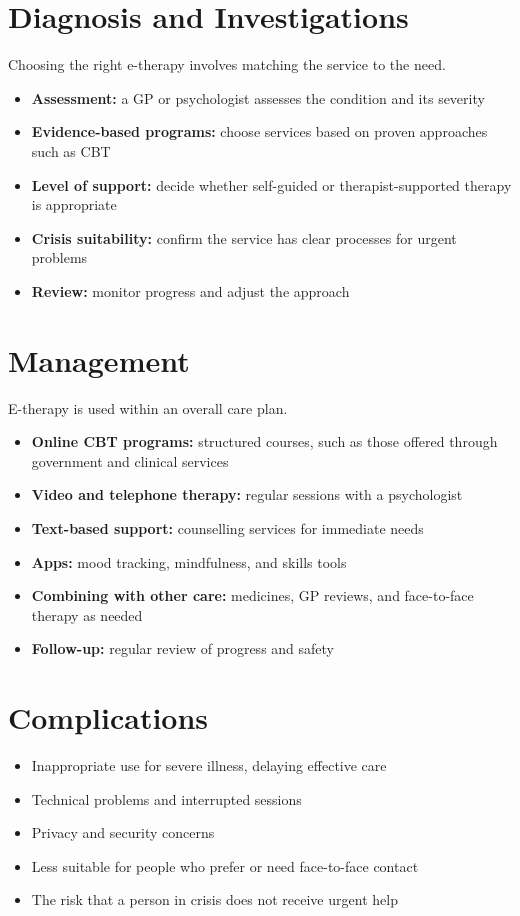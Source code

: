 \section*{Diagnosis and Investigations}
Choosing the right e-therapy involves matching the service to the need.
\begin{itemize}
    \item \textbf{Assessment:} a GP or psychologist assesses the condition and its severity
    \item \textbf{Evidence-based programs:} choose services based on proven approaches such as CBT
    \item \textbf{Level of support:} decide whether self-guided or therapist-supported therapy is appropriate
    \item \textbf{Crisis suitability:} confirm the service has clear processes for urgent problems
    \item \textbf{Review:} monitor progress and adjust the approach
\end{itemize}

\section*{Management}
E-therapy is used within an overall care plan.
\begin{itemize}
    \item \textbf{Online CBT programs:} structured courses, such as those offered through government and clinical services
    \item \textbf{Video and telephone therapy:} regular sessions with a psychologist
    \item \textbf{Text-based support:} counselling services for immediate needs
    \item \textbf{Apps:} mood tracking, mindfulness, and skills tools
    \item \textbf{Combining with other care:} medicines, GP reviews, and face-to-face therapy as needed
    \item \textbf{Follow-up:} regular review of progress and safety
\end{itemize}

\section*{Complications}
\begin{itemize}
    \item Inappropriate use for severe illness, delaying effective care
    \item Technical problems and interrupted sessions
    \item Privacy and security concerns
    \item Less suitable for people who prefer or need face-to-face contact
    \item The risk that a person in crisis does not receive urgent help
\end{itemize}

